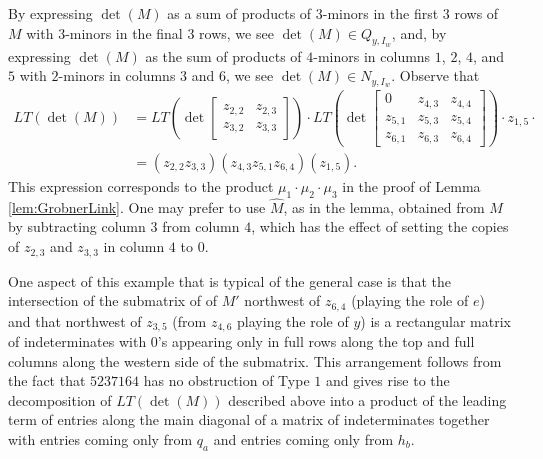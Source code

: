 \begin{example}
 By expressing $\det(M)$ as a sum of products of $3$-minors in the first $3$ rows of $M$ with $3$-minors in the final $3$ rows, we see $\det(M) \in Q_{y,I_w}$, and, by expressing $\det(M)$ as the sum of products of $4$-minors in columns $1$, $2$, $4$, and $5$ with $2$-minors in columns $3$ and $6$, we see $\det(M) \in N_{y,I_w}$.  Observe that \begin{align*}
 LT(\det(M)) &=  LT\left(\det \begin{bmatrix} z_{2,2} & z_{2,3} \\ z_{3,2} & z_{3,3} \end{bmatrix} \right) \cdot LT\left(\det  \begin{bmatrix} 0 & z_{4,3} & z_{4,4} \\ z_{5,1} & z_{5,3} & z_{5,4} \\ z_{6,1} & z_{6,3} & z_{6,4} \end{bmatrix}\right) \cdot z_{1,5} \cdot\\
 &= (z_{2,2}z_{3,3})(z_{4,3}z_{5,1}z_{6,4})(z_{1,5}).
 \end{align*}
 This expression corresponds to the product $\mu_1 \cdot \mu_2 \cdot \mu_3$ in the proof of Lemma \ref{lem:GrobnerLink}.  One may prefer to use $\widehat{M}$, as in the lemma, obtained from $M$ by subtracting column $3$ from column $4$, which has the effect of setting the copies of $z_{2,3}$ and $z_{3,3}$ in column $4$ to $0$.  
 
One aspect of this example that is typical of the general case is that the intersection of the submatrix of of $M'$ northwest of $z_{6,4}$ (playing the role of $e$) and that northwest of $z_{3,5}$ (from $z_{4,6}$ playing the role of $y$) is a rectangular matrix of indeterminates with $0$'s appearing only in full rows along the top and full columns along the western side of the submatrix.  This arrangement follows from the fact that $5237164$ has no obstruction of Type $1$ and gives rise to the decomposition of $LT(\det(M))$ described above into a product of the leading term of entries along the main diagonal of a matrix of indeterminates together with entries coming only from $q_a$ and entries coming only from $h_b$.
\end{example}

